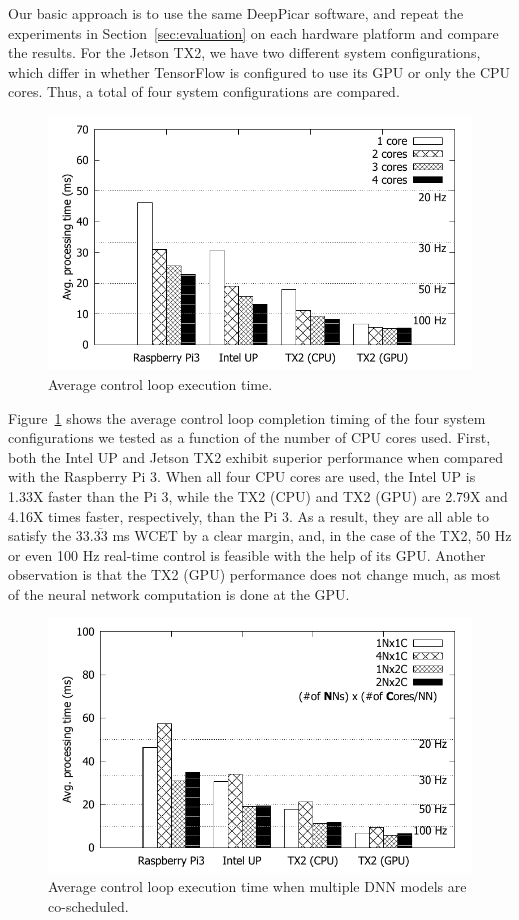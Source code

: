 Our basic approach is to use the same DeepPicar software, and repeat
the experiments in Section~\ref{sec:evaluation} on each hardware
platform and compare the results. 
For the Jetson TX2, we have two different system configurations,
which differ in whether TensorFlow is configured to use its GPU or
only the CPU cores. Thus, a total of four system configurations are
compared.

\begin{figure}[h]
  \centering
  \includegraphics[width=.7\textwidth]{figs/compare_core}
  \caption{Average control loop execution time.} 
  \label{fig:sys_core}
\end{figure}

Figure~\ref{fig:sys_core} shows the average control loop completion
timing of the four system configurations we tested as a function of
the number of CPU cores used.
First, both the Intel UP and Jetson TX2 exhibit superior performance when
compared with the Raspberry Pi 3. 
When all four CPU cores are used, the Intel UP is 1.33X faster than
the Pi 3, while the TX2 (CPU) and TX2 (GPU) are 2.79X and 4.16X times faster,
respectively, than the Pi 3. 
As a result, they are all able to satisfy the 33.$\overline{\mbox{33}}$ ms 
WCET by a clear margin,
and, in the case of the TX2, 50 Hz or even 100 Hz real-time control is
feasible with the help of its GPU. Another observation is that the TX2
(GPU) performance does not change much, as most of the neural network 
computation is done at the GPU.

\begin{figure}[h]
  \centering
  \includegraphics[width=.7\textwidth]{figs/compare_model}
  \caption{Average control loop execution time when multiple DNN
    models are co-scheduled. }
  \label{fig:sys_model}
\end{figure}

